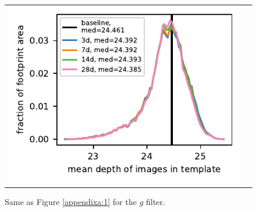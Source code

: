 \documentclass[preprintm,linenumbers]{aastex631}
\begin{document}
\begin{figure}[h]
\begin{tabular}{@{}c@{}c@{}}
					\includegraphics{results/histograms_templates_tscale/hist_first_year_one_snap_v4_0_10yrs_db_noDD_noTwi_doALLTemplateMetrics_reduceDepthTemplate_g_noDD_noTwi.pdf} \\
					
				\end{tabular}
			\caption{
				Same as Figure \ref{appendixa:1} for the $g$ filter.  \label{appendixa:2}
			}
		\end{figure}
\end{document}
